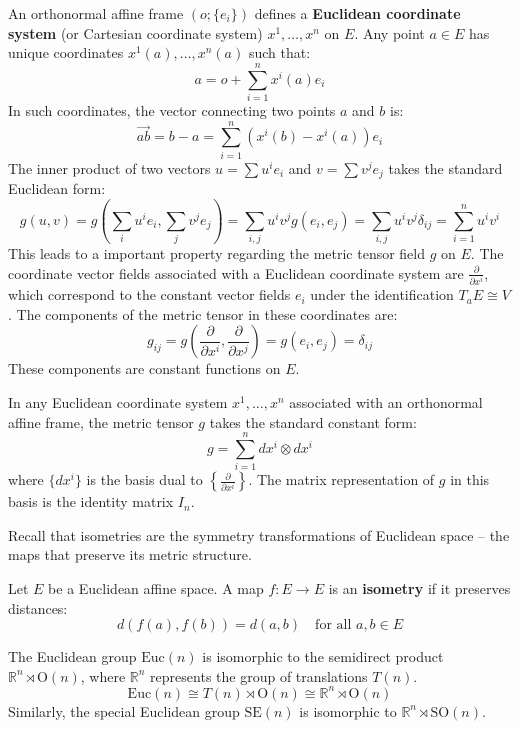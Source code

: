 An orthonormal affine frame $(o; \{e_i\})$ defines a \textbf{Euclidean coordinate system} (or Cartesian coordinate system) $x^1, \dots, x^n$ on $E$. Any point $a \in E$ has unique coordinates $x^1(a), \dots, x^n(a)$ such that:
\[
a = o + \sum_{i=1}^n x^i(a) e_i
\]
In such coordinates, the vector connecting two points $a$ and $b$ is:
\[
\vec{ab} = b - a = \sum_{i=1}^n (x^i(b) - x^i(a)) e_i
\]
The inner product of two vectors $u = \sum u^i e_i$ and $v = \sum v^j e_j$ takes the standard Euclidean form:
\[
g(u, v) = g\left(\sum_i u^i e_i, \sum_j v^j e_j\right) = \sum_{i,j} u^i v^j g(e_i, e_j) = \sum_{i,j} u^i v^j \delta_{ij} = \sum_{i=1}^n u^i v^i
\]
This leads to a important property regarding the metric tensor field $g$ on $E$. The coordinate vector fields associated with a Euclidean coordinate system are $\frac{\partial}{\partial x^i}$, which correspond to the constant vector fields $e_i$ under the identification $T_a E \cong V$. The components of the metric tensor in these coordinates are:
\[
g_{ij} = g\left(\frac{\partial}{\partial x^i}, \frac{\partial}{\partial x^j}\right) = g(e_i, e_j) = \delta_{ij}
\]
These components are constant functions on $E$.

\begin{proposition} \label{prop:standard_metric}
In any Euclidean coordinate system $x^1, \dots, x^n$ associated with an orthonormal affine frame, the metric tensor $g$ takes the standard constant form:
\[
g = \sum_{i=1}^n dx^i \otimes dx^i
\]
where $\{dx^i\}$ is the basis dual to $\left\{\frac{\partial}{\partial x^i}\right\}$. The matrix representation of $g$ in this basis is the identity matrix $I_n$.
\end{proposition}

Recall that isometries are the symmetry transformations of Euclidean space – the maps that preserve its metric structure.

\begin{definition}[Isometry] \label{def:isometry}
Let $E$ be a Euclidean affine space. A map $f: E \to E$ is an \textbf{isometry} if it preserves distances:
\[
d(f(a), f(b)) = d(a, b) \quad \text{for all } a, b \in E
\]
\end{definition}

\begin{theorem} \label{thm:euclidean_group_structure}
The Euclidean group $\text{Euc}(n)$ is isomorphic to the semidirect product $\mathbb{R}^n \rtimes \text{O}(n)$, where $\mathbb{R}^n$ represents the group of translations $T(n)$.
\[
\text{Euc}(n) \cong T(n) \rtimes \text{O}(n) \cong \mathbb{R}^n \rtimes \text{O}(n)
\]
Similarly, the special Euclidean group $\text{SE}(n)$ is isomorphic to $\mathbb{R}^n \rtimes \text{SO}(n)$.
\end{theorem}


